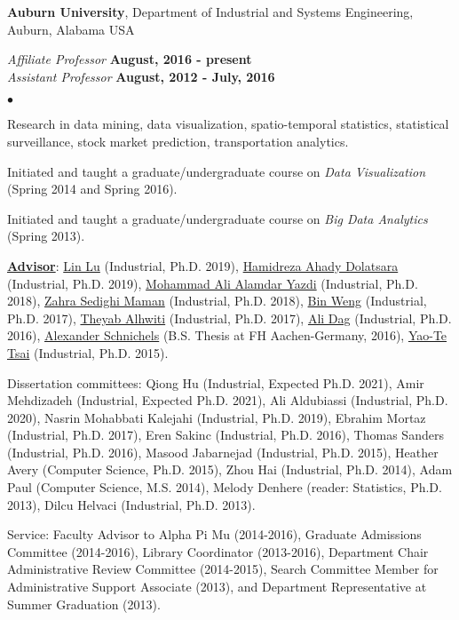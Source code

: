 \documentclass[margin,line]{res}
\newenvironment{list2}{
  \begin{list}{$\bullet$}{%
      \setlength{\itemsep}{0in}
      \setlength{\parsep}{0in} \setlength{\parskip}{0in}
      \setlength{\topsep}{0in} \setlength{\partopsep}{0in} 
      \setlength{\leftmargin}{0.2in}}}{\end{list}}
\begin{document}
\begin{resume}
{\bf Auburn University}, Department of Industrial and Systems Engineering, Auburn, Alabama USA

\vspace{-3.5mm}
{\em Affiliate Professor} \hfill {\bf August, 2016 - present}\\
{\em Assistant Professor} \hfill {\bf August, 2012 - July, 2016}\\

\vspace{-3.5mm}
\begin{list2}
	\item Research in data mining, data visualization, spatio-temporal statistics, statistical surveillance, stock market prediction, transportation analytics.
	\item Initiated and taught a graduate/undergraduate course on \textit{Data Visualization} (Spring 2014 and Spring 2016).
	\item Initiated and taught a graduate/undergraduate course on \textit{Big Data Analytics} (Spring 2013).
	\item \textbf{\ul{Advisor}}: \href{https://facultyprofile.fairfield.edu/?uname=llu}{Lin Lu} (Industrial, Ph.D. 2019), \href{https://www2.clarku.edu/faculty/facultybio.cfm?id=1189}{Hamidreza Ahady Dolatsara} (Industrial, Ph.D. 2019), \href{https://carey.jhu.edu/faculty/faculty-directory/mohammad-ali-alamdar-yazdi-phd}{Mohammad Ali Alamdar Yazdi} (Industrial, Ph.D. 2018), \href{https://www.adelphi.edu/faculty/profiles/profile.php?PID=0870}{Zahra Sedighi Maman} (Industrial, Ph.D. 2018), \href{https://www.linkedin.com/in/binweng/}{Bin Weng} (Industrial, Ph.D. 2017), \href{https://www.baystate.edu/about-baystate/faculty-staff/theyab-alhwiti/}{Theyab Alhwiti} (Industrial, Ph.D. 2017), \href{https://scholar.google.com/citations?user=ETGzb1cAAAAJ&hl=en}{Ali Dag} (Industrial, Ph.D. 2016), \href{https://www.linkedin.com/in/alexander-schnichels/}{Alexander Schnichels} (B.S. Thesis at FH Aachen-Germany, 2016), \href{http://www.itra.fcu.edu.tw/wSite/ct?xItem=182298&ctNode=36356&mp=425102&idPath=}{Yao-Te Tsai} (Industrial, Ph.D. 2015).
	\item Dissertation committees: Qiong Hu (Industrial, Expected Ph.D. 2021), Amir Mehdizadeh (Industrial, Expected Ph.D. 2021), Ali Aldubiassi (Industrial, Ph.D. 2020), Nasrin Mohabbati Kalejahi (Industrial, Ph.D. 2019), Ebrahim Mortaz (Industrial, Ph.D. 2017), Eren Sakinc (Industrial, Ph.D. 2016), Thomas Sanders (Industrial, Ph.D. 2016), Masood Jabarnejad (Industrial, Ph.D. 2015), Heather Avery (Computer Science, Ph.D. 2015), Zhou Hai (Industrial, Ph.D. 2014), Adam Paul (Computer Science, M.S. 2014), Melody Denhere (reader: Statistics, Ph.D. 2013), Dilcu Helvaci (Industrial, Ph.D. 2013). 
	\item Service: Faculty Advisor to Alpha Pi Mu (2014-2016), Graduate Admissions Committee (2014-2016), Library Coordinator (2013-2016), Department Chair Administrative Review Committee (2014-2015), Search Committee Member for Administrative Support Associate (2013), and Department Representative at Summer Graduation (2013).
\end{list2}


\end{resume}
\end{document}
